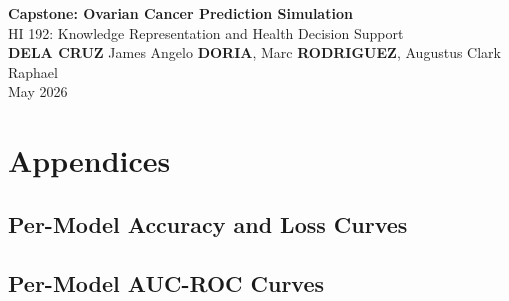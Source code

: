 \documentclass[12pt,a4paper]{article}
\begin{document}
\begin{titlepage}
  \centering
  \vspace*{4cm}
  {\LARGE\textbf{Capstone: Ovarian Cancer Prediction Simulation}\\[1.5em]}
  {\large HI 192: Knowledge Representation and Health Decision Support\\[1.5em]}
  {\large \textbf{DELA CRUZ} James Angelo \quad \textbf{DORIA}, Marc \quad \textbf{RODRIGUEZ}, Augustus Clark Raphael\\[1em]}
  {\large May 2026}
  \vfill
\end{titlepage}

\thispagestyle{empty}
\tableofcontents
\newpage
\listoffigures
\newpage
\listoftables
\newpage

\newpage


\newpage


\newpage


\newpage


\newpage


\newpage


\newpage


\newpage


\newpage
\section{Appendices}

\let\oldincludegraphics\includegraphics
\renewcommand{\includegraphics}[2][]{%
  \IfFileExists{#2}{%
    \oldincludegraphics[#1]{#2}%
  }{%
    \framebox[\linewidth]{\tiny Missing: \detokenize{#2}}%
  }%
}

\subsection{Per-Model Accuracy and Loss Curves}
\label{appx:acc-loss}


\subsection{Per-Model AUC-ROC Curves}
\label{appx:auc-roc}

\end{document}
